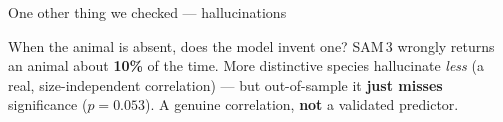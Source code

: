 \documentclass[aspectratio=169,11pt]{beamer}
\begin{document}
\begin{frame}{One other thing we checked --- hallucinations}
  \begin{block}{When the animal is absent, does the model invent one?}
    \footnotesize
    SAM\,3 wrongly returns an animal about \textbf{10\%} of the time. More distinctive species hallucinate
    \emph{less} (a real, size-independent correlation) --- but out-of-sample it \textbf{just misses}
    significance ($p=0.053$). A genuine correlation, \textbf{not} a validated predictor.
  \end{block}
\end{frame}
\end{document}

